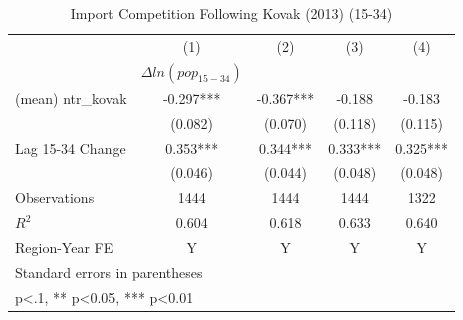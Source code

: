 \documentclass[12pt, final]{CSP}
\begin{document}
\begin{table}[htbp]\centering
\def\sym#1{\ifmmode^{#1}\else\(^{#1}\)\fi}
\caption{Import Competition Following Kovak (2013) (15-34)}
\begin{tabular}{l*{4}{c}}
\hline
\toprule
                    &\multicolumn{1}{c}{(1)}&\multicolumn{1}{c}{(2)}&\multicolumn{1}{c}{(3)}&\multicolumn{1}{c}{(4)}\\
                    &\multicolumn{1}{c}{$\Delta ln(pop_{15-34})$}&\multicolumn{1}{c}{}&\multicolumn{1}{c}{}&\multicolumn{1}{c}{}\\
\hline
\midrule
(mean) ntr\_kovak    &   -0.297***&   -0.367***&   -0.188   &   -0.183   \\
                    &  (0.082)   &  (0.070)   &  (0.118)   &  (0.115)   \\
\addlinespace
Lag 15-34 Change    &    0.353***&    0.344***&    0.333***&    0.325***\\
                    &  (0.046)   &  (0.044)   &  (0.048)   &  (0.048)   \\

\hline 
\midrule
Observations        &     1444   &     1444   &     1444   &     1322   \\
\(R^{2}\)           &    0.604   &    0.618   &    0.633   &    0.640   \\
Region-Year FE      &        Y   &        Y   &        Y   &        Y   \\
\hline
\bottomrule
\multicolumn{5}{l}{\footnotesize Standard errors in parentheses}\\
\multicolumn{5}{l}{\footnotesize * p<.1, ** p<0.05, *** p<0.01}\\
\end{tabular}
\end{table}
\end{document}
